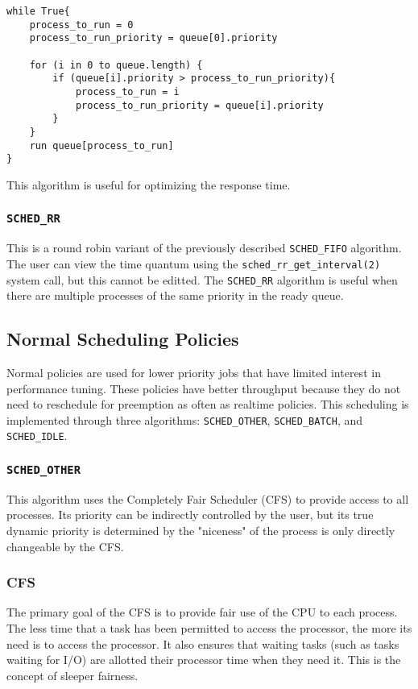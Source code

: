 \documentclass[12pt]{article}
\begin{document}
\singlespacing
\begin{lstlisting}
while True{
	process_to_run = 0
	process_to_run_priority = queue[0].priority

	for (i in 0 to queue.length) {
		if (queue[i].priority > process_to_run_priority){
			process_to_run = i
			process_to_run_priority = queue[i].priority
		}
	}
	run queue[process_to_run]
}
\end{lstlisting}
\doublespacing
This algorithm is useful for optimizing the response time. 


\subsubsection{\lstinline|SCHED_RR|}
This is a round robin variant of the previously described \lstinline|SCHED_FIFO| algorithm. The user can view the time quantum using the \lstinline|sched_rr_get_interval(2)| system call, but this cannot be editted. The \lstinline|SCHED_RR| algorithm is useful when there are multiple processes of the same priority in the ready queue. 


\subsection{Normal Scheduling Policies}
Normal policies are used for lower priority jobs that have limited interest in performance tuning. These policies have better throughput because they do not need to reschedule for preemption as often as realtime policies. This scheduling is implemented through three algorithms: \lstinline|SCHED_OTHER|, \lstinline|SCHED_BATCH|, and \lstinline|SCHED_IDLE|.

\subsubsection{ \lstinline|SCHED_OTHER|}
This algorithm uses the Completely Fair Scheduler (CFS) to provide access to all processes. Its priority can be indirectly controlled by the user, but its true dynamic priority is determined by the "niceness" of the process is only directly changeable by the CFS.

\subsubsection{CFS}
The primary goal of the CFS is to provide fair use of the CPU to each process. The less time that a task has been permitted to access the processor, the more its need is to access the processor. It also ensures that waiting tasks (such as tasks waiting for I/O) are allotted their processor time when they need it. This is the concept of sleeper fairness.
\end{document}
